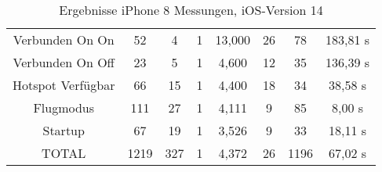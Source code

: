 \begin{landscape}
\begin{table}[h!]
\begin{tabular}{|c|c|c|c|c|c|c|c|}
      Verbunden On On & \phantom{00}52 & \phantom{00}4 & 1 & 13,000 & 26 & \phantom{00}78 & 183,81 s \\
      Verbunden On Off & \phantom{00}23 & \phantom{00}5 & 1 & \phantom{0}4,600 & 12 & \phantom{00}35 & 136,39 s \\
      Hotspot Verfügbar & \phantom{00}66 & \phantom{0}15 & 1 & \phantom{0}4,400 & 18 & \phantom{00}34 & \phantom{0}38,58 s \\
      Flugmodus & \phantom{0}111 & \phantom{0}27 & 1 & \phantom{0}4,111 & \phantom{0}9 & \phantom{00}85 & \phantom{00}8,00 s \\
      Startup & \phantom{00}67 & \phantom{0}19 & 1 & \phantom{0}3,526 & \phantom{0}9 & \phantom{00}33 & \phantom{0}18,11 s \\
      \hline
      TOTAL & 1219 & 327 & 1 & \phantom{0}4,372 & 26 & 1196 & \phantom{0}67,02 s \\
      \hline
      \end{tabular}
      \caption{Ergebnisse iPhone 8 Messungen, iOS-Version 14
      \label{table:iphone8-14-results}} 
   \end{table}
   
   \clearpage 


\end{landscape}
